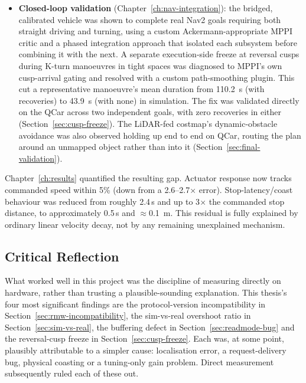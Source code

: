 \begin{itemize}
    more than an order of magnitude once corrected. Independently,
    a real $\approx$39\% steering-gain error was characterised
    through a seven-point sweep and corrected to $\approx$5.6\%
    residual error (Section~\ref{sec:steering-gain}). This error was
    separate from the vehicle's zero-point trim and was not fixed by
    it.
  \item \textbf{Closed-loop validation} (Chapter~\ref{ch:nav-integration}):
    the bridged, calibrated vehicle was shown to complete real Nav2
    goals requiring both straight driving and turning, using a custom
    Ackermann-appropriate MPPI critic and a phased integration
    approach that isolated each subsystem before combining it with the
    next. A separate execution-side freeze at reversal cusps during
    K-turn manoeuvres in tight spaces was diagnosed to MPPI's own
    cusp-arrival gating and resolved with a custom path-smoothing
    plugin. This cut a representative manoeuvre's mean duration from
    \SI{110.2}{\second} (with recoveries) to \SI{43.9}{\second} (with
    none) in simulation. The fix was validated directly on the
    QCar across two independent goals, with zero
    recoveries in either (Section~\ref{sec:cusp-freeze}). The
    LiDAR-fed costmap's dynamic-obstacle avoidance was also observed
    holding up end to end on QCar, routing the plan around an
    unmapped object rather than into it
    (Section~\ref{sec:final-validation}).
\end{itemize}

Chapter~\ref{ch:results} quantified the resulting gap. Actuator
response now tracks commanded speed within 5\% (down from a
2.6--2.7$\times$ error). Stop-latency/coast behaviour was reduced
from roughly 2.4\,s and up to 3$\times$ the commanded stop distance,
to approximately 0.5\,s and $\approx$\SI{0.1}{\meter}. This residual
is fully explained by ordinary linear velocity decay, not by any
remaining unexplained mechanism.

\subsection{Critical Reflection}
\label{sec:critical-reflection}

What worked well in this project was the discipline of measuring
directly on hardware, rather than trusting a plausible-sounding
explanation. This thesis's four most significant findings are the
protocol-version incompatibility in
Section~\ref{sec:rmw-incompatibility}, the sim-vs-real overshoot
ratio in Section~\ref{sec:sim-vs-real}, the buffering defect in
Section~\ref{sec:readmode-bug} and the reversal-cusp freeze in
Section~\ref{sec:cusp-freeze}. Each was, at some point, plausibly
attributable to a simpler cause: localisation error, a
request-delivery bug, physical coasting or a tuning-only gain
problem. Direct measurement subsequently ruled each of these out.

